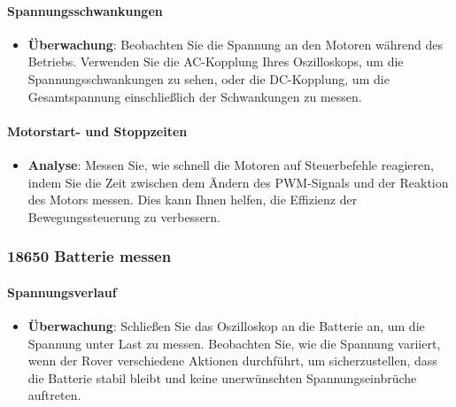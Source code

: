 \documentclass{vorlage-design-main}
\begin{document}
\hypertarget{spannungsschwankungen}{%
\paragraph{Spannungsschwankungen}\label{spannungsschwankungen}}

\begin{itemize}

\item
  \textbf{Überwachung}: Beobachten Sie die Spannung an den Motoren
  während des Betriebs. Verwenden Sie die AC-Kopplung Ihres
  Oszilloskops, um die Spannungsschwankungen zu sehen, oder die
  DC-Kopplung, um die Gesamtspannung einschließlich der Schwankungen zu
  messen.
\end{itemize}

\hypertarget{motorstart--und-stoppzeiten}{%
\paragraph{Motorstart- und
Stoppzeiten}\label{motorstart--und-stoppzeiten}}

\begin{itemize}

\item
  \textbf{Analyse}: Messen Sie, wie schnell die Motoren auf
  Steuerbefehle reagieren, indem Sie die Zeit zwischen dem Ändern des
  PWM-Signals und der Reaktion des Motors messen. Dies kann Ihnen
  helfen, die Effizienz der Bewegungssteuerung zu verbessern.
\end{itemize}

\hypertarget{batterie-messen}{%
\subsubsection{18650 Batterie messen}\label{batterie-messen}}

\hypertarget{spannungsverlauf}{%
\paragraph{Spannungsverlauf}\label{spannungsverlauf}}

\begin{itemize}

\item
  \textbf{Überwachung}: Schließen Sie das Oszilloskop an die Batterie
  an, um die Spannung unter Last zu messen. Beobachten Sie, wie die
  Spannung variiert, wenn der Rover verschiedene Aktionen durchführt, um
  sicherzustellen, dass die Batterie stabil bleibt und keine
  unerwünschten Spannungseinbrüche auftreten.
\end{itemize}
\end{document}
